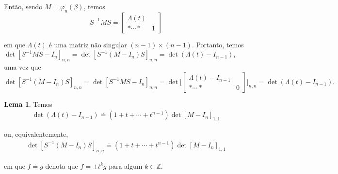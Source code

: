 \documentclass[a4paper,portuguese,11pt,twoside, leqno]{book}
\theoremstyle{definition}
\newtheorem{lemma}[theorem]{Lema}
\begin{document}
	\par\vspace{0.3cm} Então, sendo $M = \varphi_n(\beta)$, temos
	\begin{equation*}
	S^{-1}MS = \left[\begin{array}{c|c}
	\Lambda(t) & \\
	\hline 
	\ast \cdots \ast & 1
	\end{array}\right] 
	\end{equation*}
	\par\vspace{0.3cm} em que $\Lambda(t)$ é uma matriz não singular $(n-1)\times(n-1)$. Portanto, temos $ \det[ S^{-1}MS - I_n]_{n,n} = \det[S^{-1}(M - I_n)S]_{n,n} = \det(\Lambda(t) - I_{n-1})$, uma vez que
	\begin{equation*}
	\det[S^{-1}(M - I_n)S]_{n,n} = \det[S^{-1}MS - I_n]_{n,n} = \det\Bigg[ \left[\begin{array}{c|c}
	\Lambda(t) - I_{n-1} & \\
	\hline
	\ast\cdots\ast & 0
	\end{array}\right]\Bigg]_{n,n} = \det(\Lambda(t) - I_{n-1}). 
	\end{equation*}
	\begin{lemma}
		\label{lema Alexander}
		Temos 
		\begin{align*}
		\det(\Lambda(t) - I_{n-1}) \doteq(1+t+\cdots+t^{n-1})\det[M-I_n]_{1,1}
		\end{align*}
		\par\vspace{0.3cm} ou, equivalentemente, 
		\begin{align*}
		\det[S^{-1}(M - I_{n})S]_{n,n} \doteq(1+t+\cdots+t^{n-1})\det[M-I_n]_{1,1}
		\end{align*}
		\par\vspace{0.3cm} em que $f\doteq g$ denota que $f = \pm t^kg$ para algum $k\in\mathbb{Z}$.
	\end{lemma}
	
\end{document}

